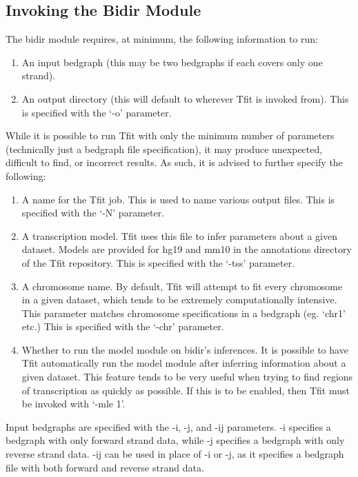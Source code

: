 \documentclass[12pt,letterpaper]{article}
\begin{document}
\subsection{Invoking the Bidir Module}
The bidir module requires, at minimum, the following information to run:
\begin{enumerate}
\item An input bedgraph (this may be two bedgraphs if each covers only one strand).
\item An output directory (this will default to wherever Tfit is invoked from). This is specified with the `-o' parameter.
\end{enumerate}

While it is possible to run Tfit with only the minimum number of parameters (technically just a bedgraph file specification), it may produce unexpected, difficult to find, or incorrect results. As such, it is advised to further specify the following:

\begin{enumerate}
\item A name for the Tfit job. This is used to name various output files. This is specified with the `-N' parameter.
\item A transcription model. Tfit uses this file to infer parameters about a given dataset. Models are provided for hg19 and mm10 in the annotations directory of the Tfit repository. This is specified with the `-tss' parameter.
\item A chromosome name. By default, Tfit will attempt to fit every chromosome in a given dataset, which tends to be extremely computationally intensive. This parameter matches chromosome specifications in a bedgraph (eg. `chr1' etc.) This is specified with the `-chr' parameter.
\item Whether to run the model module on bidir's inferences. It is possible to have Tfit automatically run the model module after inferring information about a given dataset. This feature tends to be very useful when trying to find regions of transcription as quickly as possible. If this is to be enabled, then Tfit must be invoked with `-mle 1'.
\end{enumerate}

Input bedgraphs are specified with the -i, -j, and -ij parameters. -i specifies a bedgraph with only forward strand data, while -j specifies a bedgraph with only reverse strand data. -ij can be used in place of -i or -j, as it specifies a bedgraph file with both forward and reverse strand data.
\end{document}
